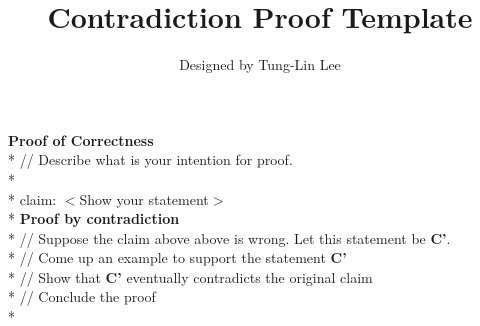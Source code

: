 \documentclass{article}
\title{Contradiction Proof Template}
\author{Designed by Tung-Lin Lee}
\begin{document}
\maketitle %

\noindent
\textbf{Proof of Correctness} \\*
// Describe what is your intention for proof. \\* \\*
claim: $<$Show your statement$>$ \\*
\noindent
\textbf{Proof by contradiction} \\*
// Suppose the claim above above is wrong. Let this statement be \textbf{C'}. \\*
// Come up an example to support the statement \textbf{C'} \\*
// Show that \textbf{C'} eventually contradicts the original claim \\*
// Conclude the proof \\*
\end{document}
